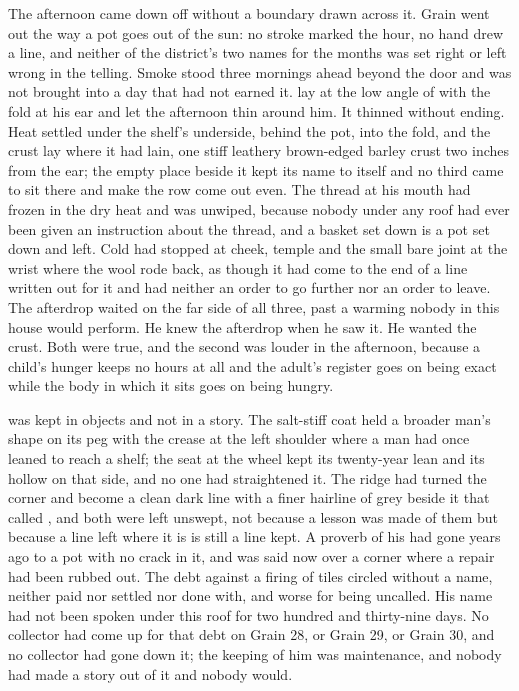 The afternoon came down off  without a boundary drawn across it. Grain went out the way a pot goes out of the sun: no stroke marked the hour, no hand drew a line, and neither of the district's two names for the months was set right or left wrong in the telling. Smoke stood three mornings ahead beyond the door and was not brought into a day that had not earned it.  lay at the low angle of  with the fold at his ear and let the afternoon thin around him. It thinned without ending. Heat settled under the shelf's underside, behind the pot, into the fold, and the crust lay where it had lain, one stiff leathery brown-edged barley crust two inches from the ear; the empty place beside it kept its name to itself and no third came to sit there and make the row come out even. The thread at his mouth had frozen in the dry heat and was unwiped, because nobody under any roof had ever been given an instruction about the thread, and a basket set down is a pot set down and left. Cold had stopped at cheek, temple and the small bare joint at the wrist where the wool rode back, as though it had come to the end of a line written out for it and had neither an order to go further nor an order to leave. The afterdrop waited on the far side of all three, past a warming nobody in this house would perform. He knew the afterdrop when he saw it. He wanted the crust. Both were true, and the second was louder in the afternoon, because a child's hunger keeps no hours at all and the adult's register goes on being exact while the body in which it sits goes on being hungry.

 was kept in objects and not in a story. The salt-stiff coat held a broader man's shape on its peg with the crease at the left shoulder where a man had once leaned to reach a shelf; the seat at the wheel kept its twenty-year lean and its hollow on that side, and no one had straightened it. The  ridge had turned the corner and become a clean dark line with a finer hairline of grey beside it that  called , and both were left unswept, not because a lesson was made of them but because a line left where it is is still a line kept. A proverb of his had gone years ago to a pot with no crack in it, and was said now over a corner where a repair had been rubbed out. The debt against a firing of tiles circled without a name, neither paid nor settled nor done with, and worse for being uncalled. His name had not been spoken under this roof for two hundred and thirty-nine days. No collector had come up  for that debt on Grain 28, or Grain 29, or Grain 30, and no collector had gone down it; the keeping of him was maintenance, and nobody had made a story out of it and nobody would.

